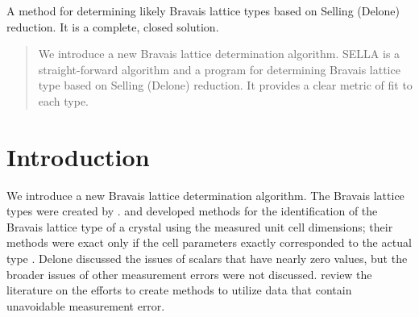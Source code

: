 \documentclass[preprint]{iucr}              %
\begin{document}


\maketitle                        %

\begin{synopsis}
A method for determining likely Bravais lattice types based on Selling (Delone) 
reduction. It is a complete, closed solution.
\end{synopsis}

\begin{abstract}
We introduce a new Bravais lattice determination algorithm. SELLA is a 
straight-forward algorithm and a program for determining Bravais lattice type 
based on Selling (Delone) reduction. It provides a clear metric of fit to each type.
\end{abstract}
		




\section{Introduction}

We introduce a new Bravais lattice determination algorithm. The Bravais 
lattice types were created by .  
and  developed methods for the identification 
of the Bravais lattice type of a crystal using the measured unit cell 
dimensions; their methods were exact only if the cell parameters 
exactly corresponded to the actual type \cite{Patterson1957}. 
Delone discussed the issues of scalars that have nearly zero values, 
but the broader issues of other measurement errors were not 
discussed.  review the literature on 
the efforts to create methods to utilize data that contain unavoidable 
measurement error.
\end{document}
